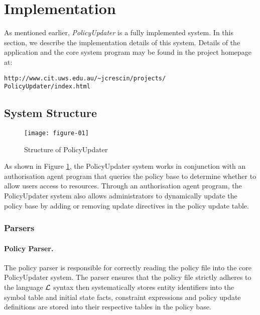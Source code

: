 \documentclass[global,twocolumn,final]{svjour}
\newenvironment{vquote}
  {\begin{list}{}{\leftmargin 1em}\item[]}
  {\end{list}}
\begin{document}
  \section{Implementation}
    \label{sec-implement}

    As mentioned earlier, {\em PolicyUpdater} is a fully implemented system.
    In this section, we describe the implementation details of this system.
    Details of the application and the core system program may be found in
    the project homepage at:

    \begin{vquote}
      {\tt\scriptsize http://www.cit.uws.edu.au/\~{}jcrescin/projects/} \\
      {\tt\scriptsize PolicyUpdater/index.html}
    \end{vquote}

    \subsection{System Structure}

    \begin{figure}[ht]
      \begin{center}
        \texttt{[image: figure-01]}
        \caption{Structure of PolicyUpdater}
        \label{fig-1}
      \end{center}
    \end{figure}

      As shown in Figure \ref{fig-1}, the PolicyUpdater system works in
      conjunction with an authorisation agent program that queries the
      policy base to determine whether to allow users access to resources.
      Through an authorisation agent program, the PolicyUpdater system also
      allows administrators to dynamically update the policy base by adding
      or removing update directives in the policy update table.

      \subsubsection{Parsers}

        \paragraph{Policy Parser.}

          The policy parser is responsible for correctly reading the policy
          file into the core PolicyUpdater system. The parser ensures that
          the policy file strictly adheres to the language $\cal{L}$ syntax
          then systematically stores entity identifiers into the symbol table
          and initial state facts, constraint expressions and policy update
          definitions are stored into their respective tables in the policy
          base.
\end{document}
